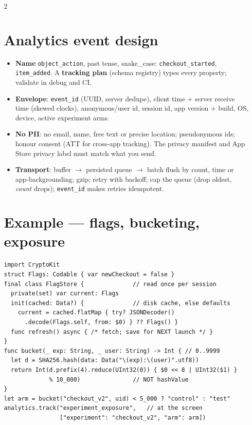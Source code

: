 \documentclass[8pt]{extarticle}
\newcommand\ct[1]{\texttt{#1}}
\begin{document}
\begin{multicols}{2}
\section{Analytics event design}
\begin{itemize}
  \item \textbf{Name} \ct{object\_action}, past tense, snake\_case:
        \ct{checkout\_started}, \ct{item\_added}. A \textbf{tracking plan}
        (schema registry) types every property; validate in debug and CI.
  \item \textbf{Envelope}: \ct{event\_id} (UUID, server dedupe), client time +
        server receive time (skewed clocks), anonymous/user id, session id, app
        version + build, OS, device, active experiment arms.
  \item \textbf{No PII}: no email, name, free text or precise location;
        pseudonymous ids; honour consent (ATT for cross-app tracking). The
        privacy manifest and App Store privacy label must match what you send.
  \item \textbf{Transport}: buffer $\to$ persisted queue $\to$ batch flush by
        count, time or app-backgrounding; gzip; retry with backoff; cap the queue
        (drop oldest, \emph{count} drops); \ct{event\_id} makes retries idempotent.
\end{itemize}

\columnbreak

\section{Example — flags, bucketing, exposure}
\begin{lstlisting}[language=SwiftSheet]
import CryptoKit
struct Flags: Codable { var newCheckout = false }
final class FlagStore {              // read once per session
  private(set) var current: Flags
  init(cached: Data?) {              // disk cache, else defaults
    current = cached.flatMap { try? JSONDecoder()
      .decode(Flags.self, from: $0) } ?? Flags() }
  func refresh() async { /* fetch; save for NEXT launch */ }
}
func bucket(_ exp: String, _ user: String) -> Int { // 0..9999
  let d = SHA256.hash(data: Data("\(exp):\(user)".utf8))
  return Int(d.prefix(4).reduce(UInt32(0)) { $0 << 8 | UInt32($1) }
             % 10_000)               // NOT hashValue
}
let arm = bucket("checkout_v2", uid) < 5_000 ? "control" : "test"
analytics.track("experiment_exposure",   // at the screen
                ["experiment": "checkout_v2", "arm": arm])
\end{lstlisting}


\end{multicols}
\end{document}
